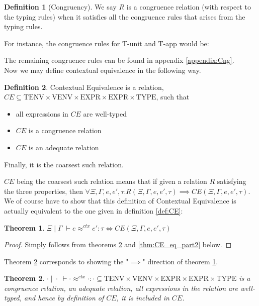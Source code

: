 \documentclass[a4paper, 11pt]{report}
\newtheorem{theorem}{Theorem}
\theoremstyle{definition}
\newtheorem{definition}{Definition}[section]
\newcommand{\expr}{e}
\newcommand{\TT}{()}
\newcommand{\Tvar}{X}
\newcommand{\Tapp}[1]{#1\;\_}
\newcommand{\subst}[3]{#1{\left[#3 \middle/ #2 \right]}}
\newcommand{\Tunit}{\mathsf{Unit}}
\newcommand{\Tall}[2]{\forall #1.\; #2}
\newcommand{\typ}{\tau}
\newcommand{\venv}{\Gamma}
\newcommand{\tenv}{\Xi}
\newcommand{\VENV}{\mathrm{VENV}}
\newcommand{\TENV}{\mathrm{TENV}}
\newcommand{\EXPR}{\mathrm{EXPR}}
\newcommand{\TYPE}{\mathrm{TYPE}}
\newcommand{\jdgRel}[6]{#1 \; | \; #2 \; \vdash #3 \approx^{#4} #5 : #6}
\newcommand{\ctxRel}[5]{\jdgRel{#1}{#2}{#3}{ctx}{#4}{#5}}
\begin{document}
\begin{definition}[Congruency]
  We say $R$ is a congruence relation (with respect to the typing rules) when it satisfies all the congruence rules that arises from the typing rules.
\end{definition}
For instance, the congruence rules for T-unit and T-app would be:
The remaining congruence rules can be found in appendix \ref{appendix:Cng}.\\
Now we may define contextual equivalence in the following way.
\begin{definition}\label{def:CE2}
  Contextual Equivalence is a relation, $CE \subseteq \TENV \times \VENV \times \EXPR \times \EXPR \times \TYPE$, such that
  \begin{itemize}
    \item all expressions in $CE$ are well-typed
    \item $CE$ is a congruence relation
    \item $CE$ is an adequate relation
  \end{itemize}
  Finally, it is the coarsest such relation.
\end{definition}
$CE$ being the coarsest such relation means that if given a relation $R$ satisfying the three properties, then $\forall \tenv, \venv, \expr, \expr', \typ . R(\tenv, \venv, \expr, \expr', \typ) \implies CE(\tenv, \venv, \expr, \expr', \typ)$.\\
We of course have to show that this definition of Contextual Equivalence is actually equivalent to the one given in definition \ref{def:CE}:
\begin{theorem}\label{thm:CE_eq}
  $\ctxRel{\tenv}{\venv}{\expr}{\expr'}{\typ} \iff CE(\tenv, \venv, \expr, \expr', \typ)$
\end{theorem}
\begin{proof}
  Simply follows from theorems \ref{thm:CE_eq_part1} and \ref{thm:CE_eq_part2} below.
\end{proof}
Theorem \ref{thm:CE_eq_part1} corresponds to showing the "$\implies$" direction of theorem \ref{thm:CE_eq}.
\begin{theorem}\label{thm:CE_eq_part1}
  $\ctxRel{\cdot}{\cdot}{\cdot}{\cdot}{\cdot} \subseteq \TENV \times \VENV \times \EXPR \times \EXPR \times \TYPE$ is a congruence relation, an adequate relation, all expressions in the relation are well-typed, and hence by definition of $CE$, it is included in $CE$.
\end{theorem}
\end{document}
